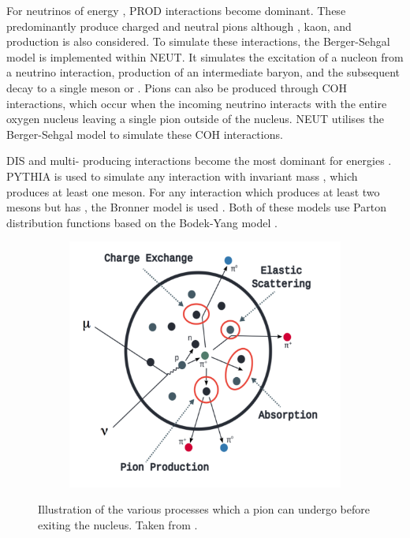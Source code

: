 For neutrinos of energy , PROD interactions become dominant. These predominantly produce charged and neutral pions although \quickmath{\gamma}, kaon, and \quickmath{\eta} production is also considered. To simulate these interactions, the Berger-Sehgal \cite{PhysRevD.76.113004} model is implemented within NEUT. It simulates the excitation of a nucleon from a neutrino interaction, production of an intermediate baryon, and the subsequent decay to a single meson or \quickmath{\gamma}. Pions can also be produced through COH interactions, which occur when the incoming neutrino interacts with the entire oxygen nucleus leaving a single pion outside of the nucleus. NEUT utilises the Berger-Sehgal \cite{Berger_Sehgal_coh} model to simulate these COH interactions.

DIS and multi-\quickmath{\pi} producing interactions become the most dominant for energies . PYTHIA \cite{Sjstrand1994} is used to simulate any interaction with invariant mass , which produces at least one meson. For any interaction which produces at least two mesons but has , the Bronner model is used \cite{Bronner2016}. Both of these models use Parton distribution functions based on the Bodek-Yang model \cite{Gl_ck_1998,10.48550/arxiv.1011.6592,10.48550/arxiv.1012.0261}. 

\begin{figure}[h]
  \begin{subfigure}[t]{0.8\textwidth}
    \includegraphics[width=\textwidth, trim={0mm 0mm 0mm 0mm}, clip,page=1]{Figures/Simulations/FSIDiagram.pdf}
  \end{subfigure}
  \caption{Illustration of the various processes which a pion can undergo before exiting the nucleus. Taken from \cite{10.48550/arxiv.1602.05299}.}
  \label{fig:Simulations_FSIDiagram}
\end{figure}

